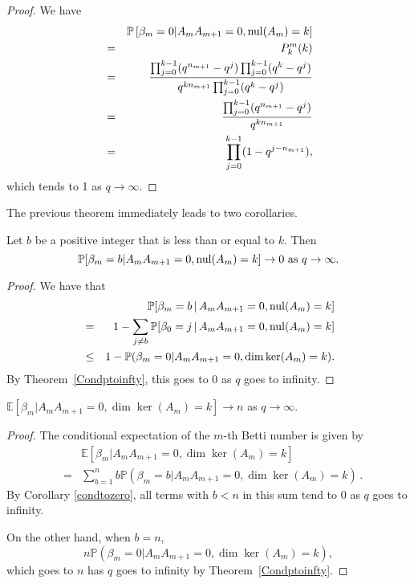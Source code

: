 \begin{proof}
We have
	\begin{eqnarray*}
	&&\mathbb{P}\left[\beta_m = 0|A_{m}A_{m+1} = 0, \mathrm{nul}(A_{m}) = k \right]\\ 
    &=& P^m_k(k)\\
    &=& \frac{\prod_{j=0}^{k-1}(q^{n_{m+1}}-q^{j})
		\prod_{j=0}^{k-1}(q^k - q^j )}
		{q^{kn_{m+1}} \prod_{j=0}^{k-1} (q^k-q^j)}\\
		&=& \frac{\prod_{j=0}^{k-1}(q^{n_{m+1}} - q^j)}
		{q^{kn_{m+1}}} \\
		&=& \prod_{j=0}^{k-1} (1-q^{j-n_{m+1}}),
	\end{eqnarray*}
which tends to 1 as $q\to\infty$.  
\end{proof}

The previous theorem immediately leads to two corollaries.  

\begin{corollary}\label{condtozero}
Let $b$ be a positive integer that is less than or equal to $k$. Then 
\[
\mathbb{P}[\beta_m = b| A_{m}A_{m+1} = 0, \mathrm{nul}(A_{m}) = k ] \to 0 \textrm{ as } q\to\infty.
\]
\end{corollary}
\begin{proof}
We have that
	\begin{eqnarray*}
	&&\mathbb{P}[\beta_m = b \,|\, A_{m}A_{m+1} = 0, \mathrm{nul}(A_{m}) = k ]\\
    &=& 1 - \sum_{j\neq b}\mathbb{P}[\beta_0 = j \,|\, A_{m}A_{m+1} = 0, \mathrm{nul}(A_{m}) = k ]\\
    &\leq& 1 - \mathbb{P}(\beta_m = 0|A_{m}A_{m+1} = 0, \dim\ker(A_{m}) = k ).
	\end{eqnarray*}
By Theorem~\ref{Condptoinfty}, this goes to $0$ as $q$ goes to infinity.
\end{proof}

\begin{corollary}
$\mathbb{E}[\beta_m | A_{m}A_{m+1} = 0, \dim\ker(A_{m}) = k ] \to n$ as $q\to\infty$.
\begin{proof}
The conditional expectation of the $m$-th Betti number is given by
	\begin{eqnarray*}
	& & \mathbb{E}[\beta_m | A_{m}A_{m+1} = 0, \dim\ker(A_{m}) = k ]\\
	&=& \sum_{b=1}^n b \mathbb{P}(\beta_m = b | A_{m}A_{m+1} = 0, \dim\ker(A_{m}) = k ) \, .
	\end{eqnarray*}
By Corollary \ref{condtozero}, all terms with $b< n$ in this sum tend to 
$0$ as $q$ goes to infinity. 

On the other hand, when $b=n$, 
\[
n\mathbb{P}(\beta_m=0| A_{m}A_{m+1} = 0, \dim\ker(A_{m}) = k ),
\]
which goes to $n$ has $q$ goes to infinity by Theorem~\ref{Condptoinfty}.
\end{proof}
\end{corollary}
